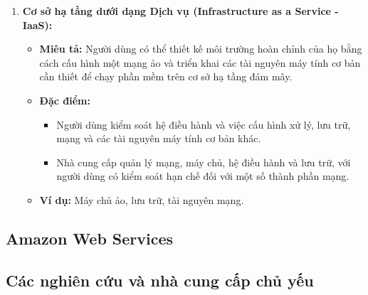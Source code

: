 \begin{enumerate}
    \item \textbf{Cơ sở hạ tầng dưới dạng Dịch vụ (Infrastructure as a Service - IaaS):}
    \begin{itemize}
        \item \textbf{Miêu tả:} Người dùng có thể thiết kế môi trường hoàn chỉnh của họ bằng cách cấu hình một mạng ảo và triển khai các tài nguyên máy tính cơ bản cần thiết để chạy phần mềm trên cơ sở hạ tầng đám mây.
        \item \textbf{Đặc điểm:}
        \begin{itemize}
            \item Người dùng kiểm soát hệ điều hành và việc cấu hình xử lý, lưu trữ, mạng và các tài nguyên máy tính cơ bản khác.
            \item Nhà cung cấp quản lý mạng, máy chủ, hệ điều hành và lưu trữ, với người dùng có kiểm soát hạn chế đối với một số thành phần mạng.
        \end{itemize}
        \item \textbf{Ví dụ:} Máy chủ ảo, lưu trữ, tài nguyên mạng.
    \end{itemize}
\end{enumerate}

\subsection{Amazon Web Services}

\subsection{Các nghiên cứu và nhà cung cấp chủ yếu}